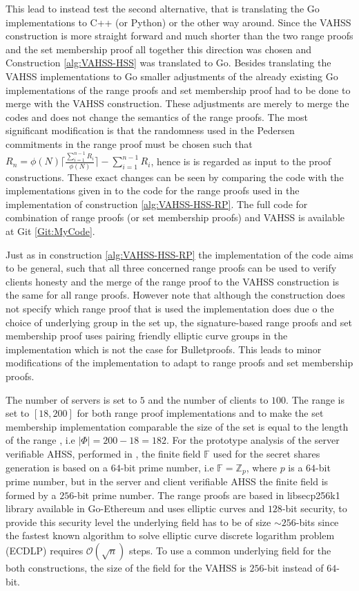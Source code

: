 This lead to instead test the second alternative, that is translating  the Go implementations to C++ (or Python) or the other way around. Since the VAHSS construction is more straight forward and much shorter than the two range proofs and the set membership proof all together this direction was chosen and Construction \ref{alg:VAHSS-HSS} was translated to Go. Besides translating the VAHSS implementations to Go smaller adjustments of the already existing Go implementations of the range proofs and set membership proof  had to be done to merge with the VAHSS construction. These adjustments are merely to merge the codes and does not change the semantics of the range proofs. The most significant modification is that the randomness used in the Pedersen commitments in the range proof must be chosen such that $R_n = \phi(N)\lceil \frac{\sum_{i=1}^{n-1}R_i}{\phi(N)}\rceil- \sum_{i=1}^{n-1}R_i$, hence is is regarded as input to the proof constructions. These exact changes can be seen by comparing the code with the implementations given in \cite{Git:RP} to the code for the range proofs used in the implementation of construction \ref{alg:VAHSS-HSS-RP}. The full code for combination of range proofs (or set membership proofs) and VAHSS is available at Git \ref{Git:MyCode}. 

Just as in construction \ref{alg:VAHSS-HSS-RP} the implementation of the code aims to be  general, such that all three concerned range proofs can be used to verify clients honesty and the merge of the range proof to the VAHSS construction is the same for all range proofs. However note that although the construction does not specify which range proof that is used the implementation does due o the choice of underlying group in the set up, the signature-based range proofs and set membership proof uses pairing friendly elliptic curve groups in the implementation which is not the case for Bulletproofs. This leads to minor modifications of the implementation to adapt to range proofs and set membership proofs.

The number of servers is set to $5$ and the number of clients to $100$.  The range is set to $[18,200]$ for both range proof implementations and to make the set  membership implementation comparable the size of the set is equal to the length of the range , i.e $|\Phi|=200-18 = 182$. For the prototype analysis of the server verifiable AHSS, performed in \cite{VAHSS}, the finite field $\mathds{F}$ used for the secret shares generation is based on a $64$-bit prime number, i.e $\mathds{F}=\mathds{Z}_p$, where $p$ is a $64$-bit prime number,  but in the server and client verifiable AHSS the finite field is formed by a $256$-bit prime number.  The range proofs are based in libsecp256k1 library available in Go-Ethereum and uses elliptic curves and $128$-bit security, to provide this security level the underlying field has to be of size $\sim 256$-bits since the fastest known algorithm to solve elliptic curve discrete logarithm problem (ECDLP) requires $\mathcal{O}(\sqrt{n})$ steps. To use a common underlying field  for the both constructions,  the size of the field for the VAHSS is $256$-bit instead of $64$-bit.

